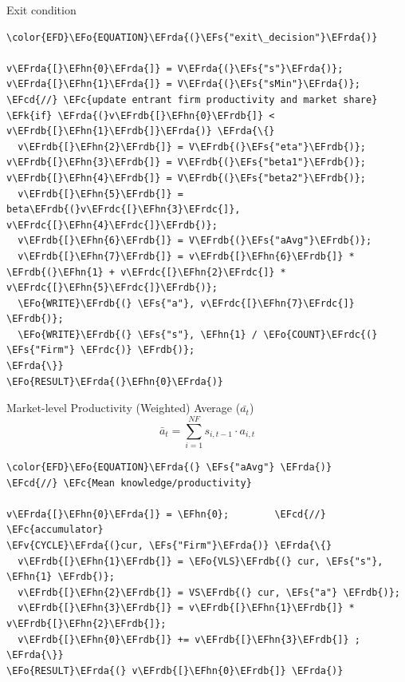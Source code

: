 \documentclass[bigger,aspectratio=169]{beamer}
\newcommand{\EFc}[1]{\textcolor{EFc}{#1}} %
\newcommand{\EFcd}[1]{\textcolor{EFcd}{#1}} %
\newcommand{\EFs}[1]{\textcolor{EFs}{#1}} %
\newcommand{\EFk}[1]{\textcolor{EFk}{#1}} %
\newcommand{\EFv}[1]{\textcolor{EFv}{#1}} %
\newcommand{\EFo}[1]{\textcolor{EFo}{#1}} %
\newcommand{\EFhn}[1]{\textcolor{EFhn}{\textbf{#1}}} %
\newcommand{\EFrda}[1]{\textcolor{EFrda}{#1}} %
\newcommand{\EFrdb}[1]{\textcolor{EFrdb}{#1}} %
\newcommand{\EFrdc}[1]{\textcolor{EFrdc}{#1}} %
\begin{document}
\begin{frame}[label={sec:orgdc2f617},fragile]{Exit condition}
 \begin{Code}
\begin{Verbatim}
\color{EFD}\EFo{EQUATION}\EFrda{(}\EFs{"exit\_decision"}\EFrda{)}

v\EFrda{[}\EFhn{0}\EFrda{]} = V\EFrda{(}\EFs{"s"}\EFrda{)}; v\EFrda{[}\EFhn{1}\EFrda{]} = V\EFrda{(}\EFs{"sMin"}\EFrda{)};
\EFcd{//} \EFc{update entrant firm productivity and market share}
\EFk{if} \EFrda{(}v\EFrdb{[}\EFhn{0}\EFrdb{]} < v\EFrdb{[}\EFhn{1}\EFrdb{]}\EFrda{)} \EFrda{\{}
  v\EFrdb{[}\EFhn{2}\EFrdb{]} = V\EFrdb{(}\EFs{"eta"}\EFrdb{)}; v\EFrdb{[}\EFhn{3}\EFrdb{]} = V\EFrdb{(}\EFs{"beta1"}\EFrdb{)}; v\EFrdb{[}\EFhn{4}\EFrdb{]} = V\EFrdb{(}\EFs{"beta2"}\EFrdb{)};
  v\EFrdb{[}\EFhn{5}\EFrdb{]} = beta\EFrdb{(}v\EFrdc{[}\EFhn{3}\EFrdc{]}, v\EFrdc{[}\EFhn{4}\EFrdc{]}\EFrdb{)};
  v\EFrdb{[}\EFhn{6}\EFrdb{]} = V\EFrdb{(}\EFs{"aAvg"}\EFrdb{)};
  v\EFrdb{[}\EFhn{7}\EFrdb{]} = v\EFrdb{[}\EFhn{6}\EFrdb{]} * \EFrdb{(}\EFhn{1} + v\EFrdc{[}\EFhn{2}\EFrdc{]} * v\EFrdc{[}\EFhn{5}\EFrdc{]}\EFrdb{)};
  \EFo{WRITE}\EFrdb{(} \EFs{"a"}, v\EFrdc{[}\EFhn{7}\EFrdc{]} \EFrdb{)};
  \EFo{WRITE}\EFrdb{(} \EFs{"s"}, \EFhn{1} / \EFo{COUNT}\EFrdc{(} \EFs{"Firm"} \EFrdc{)} \EFrdb{)};
\EFrda{\}}
\EFo{RESULT}\EFrda{(}\EFhn{0}\EFrda{)}
\end{Verbatim}
\end{Code}
\end{frame}
\begin{frame}[label={sec:orgd71174d},fragile]{Market-level Productivity (Weighted) Average (\(\bar{a_{t}}\))}
 \begin{equation}
\bar{a}_{t} =  \sum_{i=1}^{NF} s_{i, t-1}\cdot a_{i,t}
\end{equation}


\begin{Code}
\begin{Verbatim}
\color{EFD}\EFo{EQUATION}\EFrda{(} \EFs{"aAvg"} \EFrda{)}
\EFcd{//} \EFc{Mean knowledge/productivity}

v\EFrda{[}\EFhn{0}\EFrda{]} = \EFhn{0};        \EFcd{//} \EFc{accumulator}
\EFv{CYCLE}\EFrda{(}cur, \EFs{"Firm"}\EFrda{)} \EFrda{\{}
  v\EFrdb{[}\EFhn{1}\EFrdb{]} = \EFo{VLS}\EFrdb{(} cur, \EFs{"s"}, \EFhn{1} \EFrdb{)};
  v\EFrdb{[}\EFhn{2}\EFrdb{]} = VS\EFrdb{(} cur, \EFs{"a"} \EFrdb{)};
  v\EFrdb{[}\EFhn{3}\EFrdb{]} = v\EFrdb{[}\EFhn{1}\EFrdb{]} * v\EFrdb{[}\EFhn{2}\EFrdb{]};
  v\EFrdb{[}\EFhn{0}\EFrdb{]} += v\EFrdb{[}\EFhn{3}\EFrdb{]} ;
\EFrda{\}}
\EFo{RESULT}\EFrda{(} v\EFrdb{[}\EFhn{0}\EFrdb{]} \EFrda{)}
\end{Verbatim}
\end{Code}
\end{frame}
\end{document}
